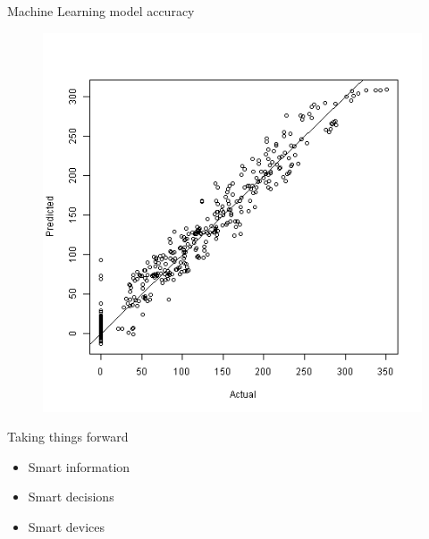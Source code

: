 \documentclass[15pt]{beamer}
\begin{document}
\begin{frame}{Machine Learning model accuracy}
	\begin{figure}
		\includegraphics[height=0.9\textheight]{pic/MLaccuracy.png}
	\end{figure}

\end{frame}


\begin{frame}{Taking things forward}
\begin{Large} %
	\begin{itemize}
		\item Smart information
		\item  Smart decisions
		\item Smart devices
	\end{itemize}
\end{Large}
\end{frame}
\end{document}
